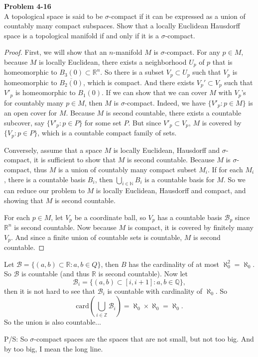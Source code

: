 \documentclass[12pt, a4paper]{article}
\theoremstyle{plain}
\newcommand{\N}{\mathbb{N}}
\newcommand{\B}{\mathscr{B}}
\newcommand{\Q}{\mathbb{Q}}
\newcommand{\R}{\mathbb{R}}
\newcommand{\Z}{\mathbb{Z}}
\newenvironment{problem}[2][Problem]
    { \begin{mdframed}[backgroundcolor=gray!20] \textbf{#1 #2} \\}
    {  \end{mdframed}}
\begin{document}
\begin{problem}{4-16}
A topological space is said to be $\sigma$-compact if it can be expressed as a union of countably many compact subspaces. Show that a locally Euclidean Hausdorff space is a topological manifold if and only if it is a $\sigma$-compact.
\end{problem}
	\begin{proof}
	First, we will show that an $n$-manifold $M$ is $\sigma$-compact. For any $p\in M$, because $M$ is locally Euclidean, there exists a neighborhood $U_p$ of $p$ that is homeomorphic to $B_3(0)\subset \R^n$. So there is a subset $V_p\subset U_p$ such that $V_p$ is homeomorphic to $\overline{B_2(0)}$, which is compact. And there exists $V_p'\subset V_p$ such that $V'_p$ is homeomorphic to $B_1(0)$. If we can show that we can cover $M$ with $V_p$'s for countably many $p\in M$, then $M$ is $\sigma$-compact. Indeed, we have $\{V'_p:p\in M\}$ is an open cover for $M$. Because $M$ is second countable, there exists a countable subcover, say $\{V'_p:p\in P\}$ for some set $P$. But since $V'_p\subset V_p$, $M$ is covered by $\{V_p:p\in P\}$, which is a countable compact family of sets. 
	
	Conversely, assume that a space $M$ is locally Euclidean, Hausdorff and $\sigma$-compact, it is sufficient to show that $M$ is second countable. Because $M$ is $\sigma$-compact, thus $M$ is a union of countably many compact subset $M_i$. If for each $M_i$, there is a countable basis $B_i$, then $\bigcup_{i\in \N}B_i$ is a countable basis for $M$. So we can reduce our problem to $M$ is locally Euclidean, Hausdorff and compact, and showing that $M$ is second countable.
	
	For each $p\in M$, let $V_p$ be a coordinate ball, so $V_p$ has a countable basis $\B_p$ since $\R^n$ is second countable. Now because $M$ is compact, it is covered by finitely many $V_p$. And since a finite union of countable sets is countable, $M$ is second countable.
	\end{proof}
	
	
Let $\B=\{(a,b)\subset \R: a,b\in Q\}$, then $B$ has the cardinality of at most $\aleph_0^2=\aleph_0$. So $\B$ is countable (and thus $\R$ is second countable). Now let 
\[
\B_i = \{(a,b)\subset [i,i+1]: a,b\in \Q\},
\]
then it is not hard to see that $\B_i$ is countable with cardinality of $\aleph_0$. So
\[
\text{card}\left(\bigcup_{i\in\Z}\B_i\right) = \aleph_0\times\aleph_0=\aleph_0.
\]
So the union is also countable...
	
P/S: So $\sigma$-compact spaces are the spaces that are not small, but not too big. And by too big, I mean the long line.
\end{document}
